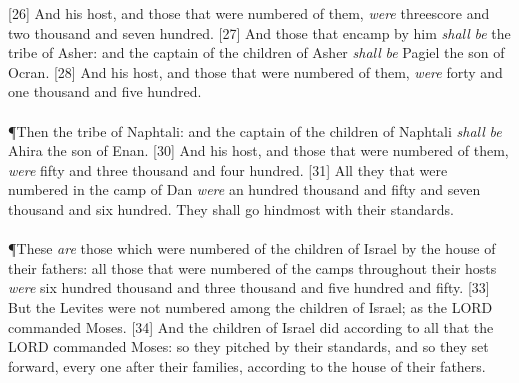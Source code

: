 [26] \textcolor[cmyk]{0.99998,1,0,0}{And his host, and those that were numbered of them, \emph{were} threescore and two thousand and seven hundred.}
[27] \textcolor[cmyk]{0.99998,1,0,0}{And those that encamp by him \emph{shall} \emph{be} the tribe of Asher: and the captain of the children of Asher \emph{shall} \emph{be} Pagiel the son of Ocran.}
[28] \textcolor[cmyk]{0.99998,1,0,0}{And his host, and those that were numbered of them, \emph{were} forty and one thousand and five hundred.}\\
\\
\P \textcolor[cmyk]{0.99998,1,0,0}{Then the tribe of Naphtali: and the captain of the children of Naphtali \emph{shall} \emph{be} Ahira the son of Enan.}
[30] \textcolor[cmyk]{0.99998,1,0,0}{And his host, and those that were numbered of them, \emph{were} fifty and three thousand and four hundred.}
[31] \textcolor[cmyk]{0.99998,1,0,0}{All they that were numbered in the camp of Dan \emph{were} an hundred thousand and fifty and seven thousand and six hundred. They shall go hindmost with their standards.}\\
\\
\P \textcolor[cmyk]{0.99998,1,0,0}{These \emph{are} those which were numbered of the children of Israel by the house of their fathers: all those that were numbered of the camps throughout their hosts \emph{were} six hundred thousand and three thousand and five hundred and fifty.}
[33] \textcolor[cmyk]{0.99998,1,0,0}{But the Levites were not numbered among the children of Israel; as the LORD commanded Moses.}
[34] \textcolor[cmyk]{0.99998,1,0,0}{And the children of Israel did according to all that the LORD commanded Moses: so they pitched by their standards, and so they set forward, every one after their families, according to the house of their fathers.}